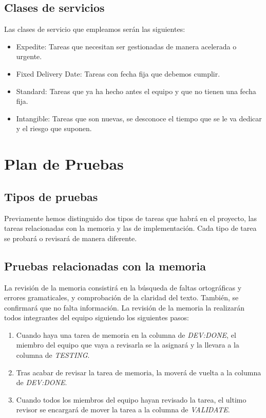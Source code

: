 \subsection{Clases de servicios}
Las clases de servicio que empleamos serán las siguientes:
\begin{itemize}
    \item Expedite: Tareas que necesitan ser gestionadas de manera acelerada o urgente.
    \item Fixed Delivery Date: Tareas con fecha fija que debemos cumplir.
    \item Standard: Tareas que ya ha hecho antes el equipo y que no tienen una fecha fija.
    \item Intangible: Tareas que son nuevas, se desconoce el tiempo que se le va dedicar y el riesgo que suponen.
\end{itemize}



\section{Plan de Pruebas}
\nocite{pipelineRedHat}
\nocite{testingSW}
\nocite{ciAmazon}
\subsection{Tipos de pruebas}
Previamente hemos distinguido dos tipos de tareas que habrá en el proyecto, las tareas relacionadas con la memoria y las de implementación. Cada tipo de tarea se probará o revisará de manera diferente.
\subsection{Pruebas relacionadas con la memoria}
La revisión de la memoria consistirá en la búsqueda de faltas ortográficas y errores gramaticales, y comprobación de la claridad del texto. También, se confirmará que no falta información.
La revisión de la memoria la realizarán todos integrantes del equipo siguiendo los siguientes pasos:
\begin{enumerate}
    \item Cuando haya una tarea de memoria en la columna de \textit{DEV:DONE}, el miembro del equipo que vaya a revisarla se la asignará y la llevara a la columna de \textit{TESTING}.
    \item Tras acabar de revisar la tarea de memoria, la moverá de vuelta a la columna de \textit{DEV:DONE}.
    \item Cuando todos los miembros del equipo hayan revisado la tarea, el ultimo revisor se encargará de mover la tarea a la columna de \textit{VALIDATE}.
\end{enumerate}
